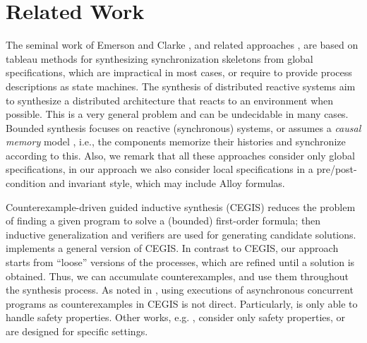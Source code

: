 \section{Related Work}
\label{sec:related}	

The seminal work of Emerson and Clarke \cite{EmersonClarke82}, and related approaches \cite{Attie16,EmersonSamanta11}, are based on tableau methods for synthesizing synchronization skeletons from global {\CTL} specifications,  which are impractical in most cases, or require to provide process descriptions as state machines.
The synthesis of distributed reactive systems \cite{PnueliRosner90}  aim to synthesize a distributed architecture that reacts to an environment when possible. This is a very general problem and can be undecidable in many cases.  Bounded synthesis \cite{DBLP:journals/sttt/FinkbeinerS13} focuses on reactive (synchronous) systems,
or assumes a \emph{causal memory}  model \cite{DBLP:journals/iandc/FinkbeinerO17},  i.e.,  the components memorize their histories and synchronize according to this.  Also, we remark that all these approaches consider only global {\LTL} specifications,  in our approach we also consider local specifications in a pre/post-condition and invariant style, which may include Alloy formulas.

Counterexample-driven guided inductive synthesis (CEGIS) \cite{Abate+2018} reduces the problem of finding a given program to solve a (bounded) first-order formula; then inductive generalization and verifiers are used for generating candidate solutions. {\AlloyStar}  \cite{Milicevic+2015} implements a general version of CEGIS. In contrast to CEGIS, our approach starts from ``loose'' versions of the processes, which are refined until a solution is obtained. Thus, we can accumulate counterexamples, and use them throughout the synthesis process.  As noted in \cite{Solar-Lezama+2008},  
using executions of asynchronous concurrent programs as counterexamples in  CEGIS is not direct.  Particularly, {\Sketch} is only able to handle safety properties.  Other works, e.g. \cite{VechevYY13,Party}, consider only safety properties, or are designed for specific settings.



